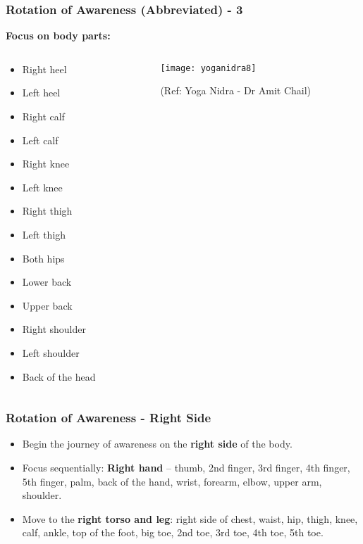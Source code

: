 \begin{frame}[fragile]\frametitle{Rotation of Awareness (Abbreviated) - 3}
    \textbf{Focus on body parts:}

\begin{columns}
    \begin{column}[T]{0.3\linewidth}
    \begin{itemize}
        \item Right heel
        \item Left heel
        \item Right calf
        \item Left calf
        \item Right knee
        \item Left knee
        \item Right thigh
        \item Left thigh
        \item Both hips
        \item Lower back
        \item Upper back
        \item Right shoulder
        \item Left shoulder
        \item Back of the head
    \end{itemize}

    \end{column}
    \begin{column}[T]{0.7\linewidth}
	      \begin{center}
        \texttt{[image: yoganidra8]}

		{\tiny (Ref: Yoga Nidra - Dr Amit Chail)}		
        \end{center}
    \end{column}
  \end{columns}
	
\end{frame}

\begin{frame}[fragile]\frametitle{Rotation of Awareness - Right Side}
    \begin{itemize}
        \item Begin the journey of awareness on the \textbf{right side} of the body.
        \item Focus sequentially: \textbf{Right hand} -- thumb, 2nd finger, 3rd finger, 4th finger, 5th finger, palm, back of the hand, wrist, forearm, elbow, upper arm, shoulder.
        \item Move to the \textbf{right torso and leg}: right side of chest, waist, hip, thigh, knee, calf, ankle, top of the foot, big toe, 2nd toe, 3rd toe, 4th toe, 5th toe.
    \end{itemize}
\end{frame}

